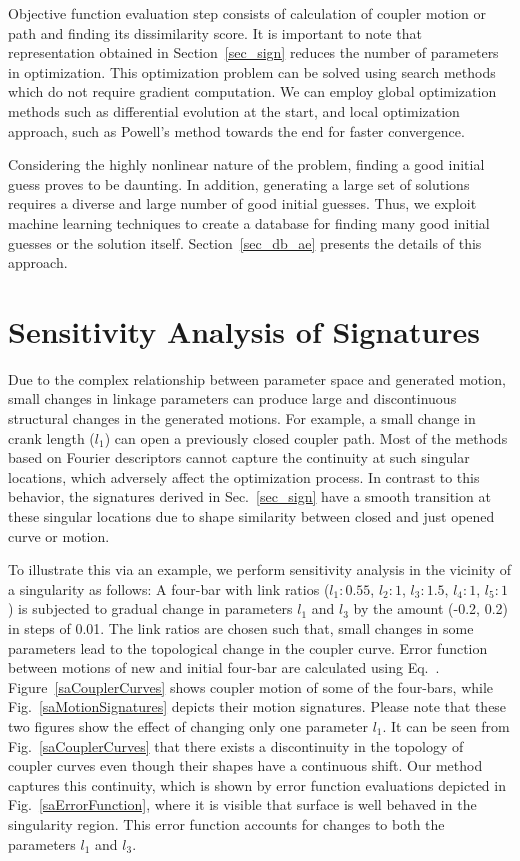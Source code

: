 Objective function evaluation step consists of calculation of coupler motion or path and finding its dissimilarity score.
It is important to note that representation obtained in Section~\ref{sec_sign} reduces the number of parameters in optimization.
This optimization problem can be solved using search methods which do not require gradient computation.
We can employ global optimization methods such as differential evolution at the start, and local optimization approach, such as Powell's method towards the end for faster convergence\cite{ullah1997}.

Considering the highly nonlinear nature of the problem, finding a good initial guess proves to be daunting. In addition, generating a large set of solutions requires a diverse and large number of good initial guesses.
Thus, we exploit machine learning techniques to create a database for finding many good initial guesses or the solution itself.
Section~\ref{sec_db_ae} presents the details of this approach.


\section{Sensitivity Analysis of Signatures}\label{sec_SA}
Due to the complex relationship between parameter space and generated motion, small changes in linkage parameters can produce large and discontinuous structural changes in the generated motions.
For example, a small change in crank length ($l_1$) can open a previously closed coupler path.
Most of the methods based on Fourier descriptors cannot capture the continuity at such singular locations, which adversely affect the optimization process.
In contrast to this behavior, the signatures derived in Sec.~\ref{sec_sign} have a smooth transition at these singular locations due to shape similarity between closed and just opened curve or motion.

To illustrate this via an example, we perform sensitivity analysis in the vicinity of a singularity as follows:
A four-bar with link ratios ($l_1:0.55$, $l_2:1$, $l_3:1.5$, $l_4:1$, $l_5:1$) is subjected to gradual change in parameters $l_1$ and $l_3$ by the amount (-0.2, 0.2) in steps of 0.01.
The link ratios are chosen such that, small changes in some parameters lead to the topological change in the coupler curve.
Error function between motions of new and initial four-bar are calculated using Eq.~. Figure~\ref{saCouplerCurves} shows coupler motion of some of the four-bars, while Fig.~\ref{saMotionSignatures} depicts their motion signatures. Please note that these two figures show the effect of changing only one parameter $l_1$.
It can be seen from Fig.~\ref{saCouplerCurves} that there exists a discontinuity in the topology of coupler curves even though their shapes have a continuous shift.
Our method captures this continuity, which is shown by error function evaluations depicted in Fig.~\ref{saErrorFunction}, where it is visible that surface is well behaved in the singularity region. This error function accounts for changes to both the parameters $l_1$ and $l_3$.

